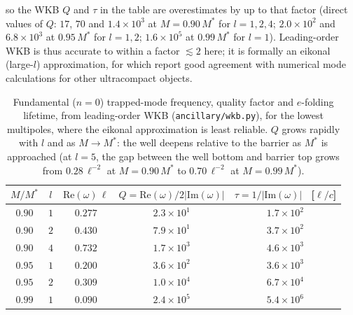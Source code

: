 \documentclass[11pt]{article}
\begin{document}
so the WKB $Q$ and $\tau$ in the table are overestimates by up to that factor (direct values of $Q$: $17$, $70$ and $1.4\times10^{3}$ at $M=0.90\,M^*$ for $l=1,2,4$; $2.0\times10^{2}$ and $6.8\times10^{3}$ at $0.95\,M^*$ for $l=1,2$; $1.6\times10^{5}$ at $0.99\,M^*$ for $l=1$). Leading-order WKB is thus accurate to within a factor $\lesssim2$ here; it is formally an eikonal (large-$l$) approximation, for which \citet{CardosoLongLived2014} report good agreement with numerical mode calculations for other ultracompact objects.

\begin{table}[htbp]
\centering
\begin{tabular}{ccccc}
\hline
$M/M^*$ & $l$ & $\mathrm{Re}(\omega)\,\ell$ & $Q=\mathrm{Re}(\omega)/2|\mathrm{Im}(\omega)|$ & $\tau=1/|\mathrm{Im}(\omega)|$ \ [$\ell/c$] \\
\hline
$0.90$ & $1$ & $0.277$ & $2.3\times10^{1}$ & $1.7\times10^{2}$ \\
$0.90$ & $2$ & $0.430$ & $7.9\times10^{1}$ & $3.7\times10^{2}$ \\
$0.90$ & $4$ & $0.732$ & $1.7\times10^{3}$ & $4.6\times10^{3}$ \\
$0.95$ & $1$ & $0.200$ & $3.6\times10^{2}$ & $3.6\times10^{3}$ \\
$0.95$ & $2$ & $0.309$ & $1.0\times10^{4}$ & $6.7\times10^{4}$ \\
$0.99$ & $1$ & $0.090$ & $2.4\times10^{5}$ & $5.4\times10^{6}$ \\
\hline
\end{tabular}
\caption{Fundamental ($n=0$) trapped-mode frequency, quality factor and $e$-folding lifetime, from leading-order WKB (\texttt{ancillary/wkb.py}), for the lowest multipoles, where the eikonal approximation is least reliable. $Q$ grows rapidly with $l$ and as $M\to M^*$: the well deepens relative to the barrier as $M^*$ is approached (at $l=5$, the gap between the well bottom and barrier top grows from $0.28\,\ell^{-2}$ at $M=0.90\,M^*$ to $0.70\,\ell^{-2}$ at $M=0.99\,M^*$).}
\label{tab:trapped}
\end{table}
\end{document}
